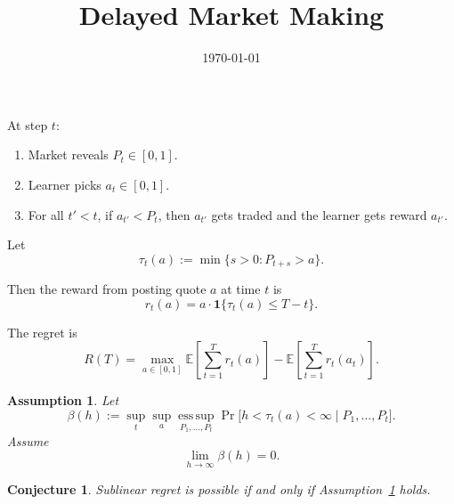 \documentclass[11pt]{article}
\title{Delayed Market Making}
\author{}
\date{\today}
\newtheorem{assumption}{Assumption}
\newtheorem{conjecture}{Conjecture}
\newcommand{\ind}[1]{\mathbf{1}\{#1\}}
\begin{document}
\maketitle

At step $t$:
\begin{enumerate}
    \item Market reveals $P_t \in [0,1]$.
    \item Learner picks $a_t \in [0,1]$.
    \item For all $t' < t$, if $a_{t'} < P_t$, then $a_{t'}$ gets traded and the learner gets reward $a_{t'}$.
\end{enumerate}

Let
\[
\tau_t(a) := \min \{s > 0 : P_{t+s} > a\}.
\]

Then the reward from posting quote $a$ at time $t$ is
\[
r_t(a) = a \cdot \ind{\tau_t(a) \le T-t}.
\]

The regret is
\[
R(T)
=
\max_{a \in [0,1]} \mathbb{E}\left[\sum_{t=1}^T r_t(a)\right]
-
\mathbb{E}\left[\sum_{t=1}^T r_t(a_t)\right].
\]

\begin{assumption}\label{ass:tail-delays}
Let
\[
\beta(h)
:=
\sup_t \sup_a
\operatorname*{ess\,sup}_{P_1,\dots,P_t}
\Pr\bigl[h < \tau_t(a) < \infty \mid P_1,\dots,P_t\bigr].
\]
Assume
\[
\lim_{h \to \infty} \beta(h)
=
0.
\]
\end{assumption}

\begin{conjecture}
Sublinear regret is possible if and only if Assumption~\ref{ass:tail-delays}
holds.
\end{conjecture}
\end{document}
